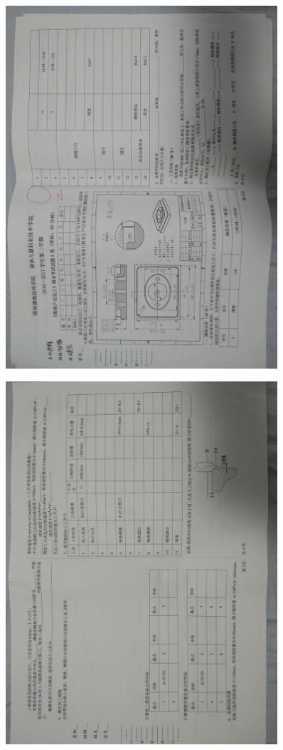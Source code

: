 \documentclass[a4paper,12pt]{article}
\numberwithin{table}{section}
\numberwithin{figure}{section}
\begin{document}
\newpage
\begin{figure}[!h]
	\centering	
	\includegraphics[width=0.9\textwidth,angle=0]{images/fenshu1}
\end{figure}
\begin{figure}[!h]
	\centering	
	\includegraphics[width=0.9\textwidth,angle=0]{images/fenshu2}
\end{figure}
\end{document}
